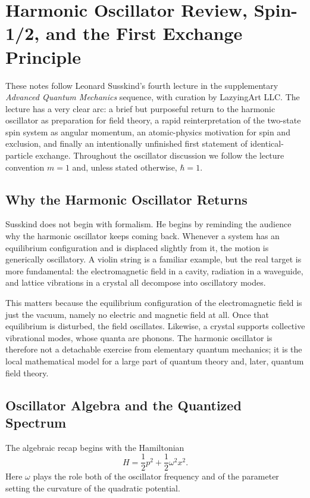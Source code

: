 \chapter{Harmonic Oscillator Review, Spin-1/2, and the First Exchange Principle}

These notes follow Leonard Susskind's fourth lecture in the supplementary \emph{Advanced Quantum Mechanics} sequence, with curation by LazyingArt LLC. The lecture has a very clear arc: a brief but purposeful return to the harmonic oscillator as preparation for field theory, a rapid reinterpretation of the two-state spin system as angular momentum, an atomic-physics motivation for spin and exclusion, and finally an intentionally unfinished first statement of identical-particle exchange. Throughout the oscillator discussion we follow the lecture convention \(m=1\) and, unless stated otherwise, \(\hbar=1\).

\section{Why the Harmonic Oscillator Returns}

Susskind does not begin with formalism. He begins by reminding the audience why the harmonic oscillator keeps coming back. Whenever a system has an equilibrium configuration and is displaced slightly from it, the motion is generically oscillatory. A violin string is a familiar example, but the real target is more fundamental: the electromagnetic field in a cavity, radiation in a waveguide, and lattice vibrations in a crystal all decompose into oscillatory modes.

This matters because the equilibrium configuration of the electromagnetic field is just the vacuum, namely no electric and magnetic field at all. Once that equilibrium is disturbed, the field oscillates. Likewise, a crystal supports collective vibrational modes, whose quanta are phonons. The harmonic oscillator is therefore not a detachable exercise from elementary quantum mechanics; it is the local mathematical model for a large part of quantum theory and, later, quantum field theory.

\section{Oscillator Algebra and the Quantized Spectrum}

The algebraic recap begins with the Hamiltonian
\begin{equation}
H=\frac{1}{2}p^{2}+\frac{1}{2}\omega^{2}x^{2}.
\end{equation}
Here \(\omega\) plays the role both of the oscillator frequency and of the parameter setting the curvature of the quadratic potential.

